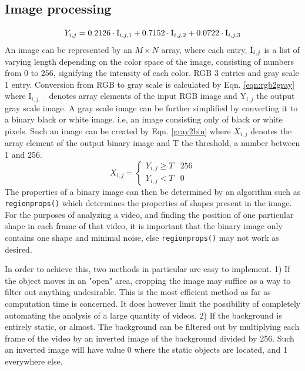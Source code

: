 \documentclass[11pt,a4paper]{article}
\begin{document}
  \subsection{Image processing\label{sect:imgpro}}
      \begin{equation}
        Y_{i, j} = 0.2126\cdot\textup{I}_{i, j, 1} 
        + 0.7152\cdot\textup{I}_{i, j, 2} 
        + 0.0722\cdot\textup{I}_{i, j, 3}
        \label{eqn:rgb2gray}
      \end{equation}
      An image can be represented by an $M \times N$ array, where each entry, $\textup{I}_{i, j}$ is a list of varying length depending on the color space of the image, consisting of numbers from 0 to 256, signifying the intensity of each color. RGB 3 entries and gray scale 1 entry. Conversion from RGB to gray scale is calculated by Eqn. \ref{eqn:rgb2gray} where I$_{i, j, ...}$ denotes array elements of the input RGB image and Y$_{i, j}$ the output gray scale image. \cite{wiki:grayscale}
      \newline
      A gray scale image can be further simplified by converting it to a binary black or white image. i.e, an image consisting only of black or white pixels. Such an image can be created by Eqn. \ref{gray2bin} where $X_{i, j}$ denotes the array element of the output binary image and T the threshold, a number between 1 and 256.
      \begin{equation}
        X_{i, j} = \left\{ 
        \begin{matrix}
          Y_{i,j} \geq T & 256 \\
          Y_{i, j} < T & 0
        \end{matrix}
        \right.
        \label{gray2bin}
      \end{equation}
      The properties of a binary image can then be determined by an algorithm such as \lstinline{regionprops()} which determines the properties of shapes present in the image. For the purposes of analyzing a video, and finding the position of one particular shape in each frame of that video, it is important that the binary image only contains one shape and minimal noise, else \lstinline{regionprops()} may not work as desired.

      In order to achieve this, two methods in particular are easy to implement. 1) If the object moves in an "open" area, cropping the image may suffice as a way to filter out anything undesirable. This is the most efficient method as far as computation time is concerned. It does however limit the possibility of completely automating the analysis of a large quantity of videos. 2) If the background is entirely static, or almost. The background can be filtered out by multiplying each frame of the video by an inverted image of the background divided by 256. Such an inverted image will have value 0 where the static objects are located, and 1 everywhere else.
\end{document}
